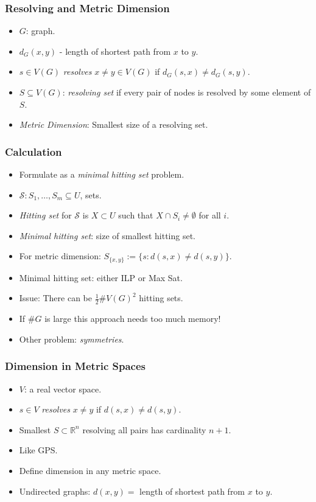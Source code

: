 \documentclass{beamer}
\newcommand{\RR}{\mathbb{R}}
\begin{document}
\begin{frame}
  \frametitle{Resolving and Metric Dimension}
  \begin{itemize}
  \item $G$: graph.
  \item $d_G(x,y)$ - length of shortest path from $x$ to $y$.
  \item $s \in V(G)$ \emph{resolves} $x \ne y \in V(G)$ if $d_G(s,x)
    \ne d_G(s,y)$.
  \item $S \subseteq V(G)$: \emph{resolving set} if every pair of
    nodes is resolved by some element of $S$.
  \item \emph{Metric Dimension}: Smallest size of a resolving set.
  \end{itemize}
\end{frame}
\begin{frame}
  \frametitle{Calculation}
  \begin{itemize}
  \item Formulate as a \emph{minimal hitting set} problem.
  \item $\mathcal{S} : S_1, \dots, S_m \subseteq U$, sets.
  \item \emph{Hitting set} for $\mathcal{S}$ is $X \subset U$
    such that $X \cap S_i \ne \emptyset$ for all $i$.
  \item \emph{Minimal hitting set}: size of smallest hitting set.
  \item For metric dimension: $S_{\{x,y\}} := \{ s : d(s,x) \ne
    d(s,y)\}$.
  \item Minimal hitting set: either ILP or Max Sat.
  \item Issue: There can be $\frac 1 2 \#V(G)^2$ hitting sets.
  \item If $\#G$ is large this approach needs too much memory!
  \item Other problem: \emph{symmetries}.
  \end{itemize}
\end{frame}
\begin{frame}
  \frametitle{Dimension in Metric Spaces}
  \begin{itemize}
  \item $V$: a real vector space.
  \item $s \in V$ \emph{resolves} $x \ne y$ if
    $d(s,x) \ne d(s,y)$.
  \item Smallest $S \subset \RR^n$ resolving all pairs
    has cardinality $n+1$.
  \item Like GPS.
  \item Define dimension in any metric space.
  \item Undirected graphs: $d(x,y)=$ length of shortest path
    from $x$ to $y$.
  \end{itemize}
\end{frame}
\end{document}
